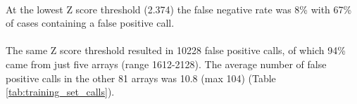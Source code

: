 \begin{table}[h]
\centering
\caption[Calls made in 86 training cases]{A very high number of false positive calls was seen in the 86 training cases using a range of Z score thresholds.}
\label{tab:training_set_calls_86}
\end{table}

\paragraph*{}
At the lowest Z score threshold (2.374) the false negative rate was 8\% with 67\% of cases containing a false positive call.
\paragraph*{}
The same Z score threshold resulted in 10228 false positive calls, of which 94\% came from just five arrays (range 1612-2128). The average number of false positive calls in the other 81 arrays was 10.8 (max 104) (Table \ref{tab:training_set_calls}).
